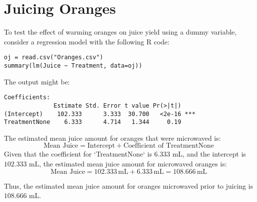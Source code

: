 \documentclass{article}
\begin{document}
\section{Juicing Oranges}

To test the effect of warming oranges on juice yield using a dummy variable, consider a regression model with the following R code:
\begin{verbatim}
oj = read.csv("Oranges.csv")
summary(lm(Juice ~ Treatment, data=oj))
\end{verbatim}

The output might be:
\begin{verbatim}
Coefficients:
              Estimate Std. Error t value Pr(>|t|)    
(Intercept)    102.333      3.333  30.700   <2e-16 ***
TreatmentNone    6.333      4.714   1.344     0.19     
\end{verbatim}

The estimated mean juice amount for oranges that were microwaved is:
\[
\text{Mean Juice} = \text{Intercept} + \text{Coefficient of TreatmentNone}
\]
Given that the coefficient for `TreatmentNone` is \( 6.333 \) mL, and the intercept is \( 102.333 \) mL, the estimated mean juice amount for microwaved oranges is:
\[
\text{Mean Juice} = 102.333 \, \text{mL} + 6.333 \, \text{mL} = 108.666 \, \text{mL}
\]

Thus, the estimated mean juice amount for oranges microwaved prior to juicing is \( 108.666 \) mL.
\end{document}
